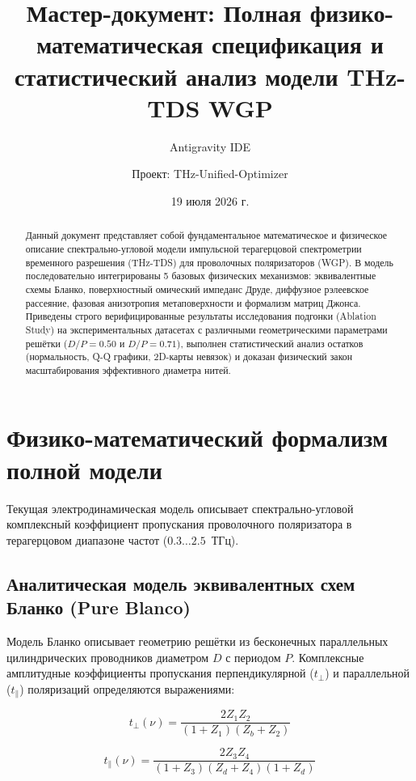 \documentclass[12pt,a4paper]{article}
\title{\textbf{Мастер-документ: Полная физико-математическая спецификация и статистический анализ модели THz-TDS WGP}}
\author{Antigravity IDE \and Проект: THz-Unified-Optimizer}
\date{19 июля 2026 г.}
\begin{document}
\maketitle

\begin{abstract}
Данный документ представляет собой фундаментальное математическое и физическое описание спектрально-угловой модели импульсной терагерцовой спектрометрии временного разрешения (THz-TDS) для проволочных поляризаторов (WGP). В модель последовательно интегрированы 5 базовых физических механизмов: эквивалентные схемы Бланко, поверхностный омический импеданс Друде, диффузное рэлеевское рассеяние, фазовая анизотропия метаповерхности и формализм матриц Джонса. Приведены строго верифицированные результаты исследования подгонки (Ablation Study) на экспериментальных датасетах с различными геометрическими параметрами решётки ($D/P = 0.50$ и $D/P = 0.71$), выполнен статистический анализ остатков (нормальность, Q-Q графики, 2D-карты невязок) и доказан физический закон масштабирования эффективного диаметра нитей.
\end{abstract}

\tableofcontents
\newpage

\section{Физико-математический формализм полной модели}

Текущая электродинамическая модель описывает спектрально-угловой комплексный коэффициент пропускания проволочного поляризатора в терагерцовом диапазоне частот ($0.3 \dots 2.5$~ТГц).

\subsection{Аналитическая модель эквивалентных схем Бланко (Pure Blanco)}
Модель Бланко описывает геометрию решётки из бесконечных параллельных цилиндрических проводников диаметром $D$ с периодом $P$. Комплексные амплитудные коэффициенты пропускания перпендикулярной ($t_{\perp}$) и параллельной ($t_{\parallel}$) поляризаций определяются выражениями:

\begin{equation}
t_{\perp}(\nu) = \frac{2 Z_1 Z_2}{(1 + Z_1)(Z_b + Z_2)}
\end{equation}

\begin{equation}
t_{\parallel}(\nu) = \frac{2 Z_3 Z_4}{(1 + Z_3)(Z_d + Z_4)(1 + Z_d)}
\end{equation}
\end{document}
